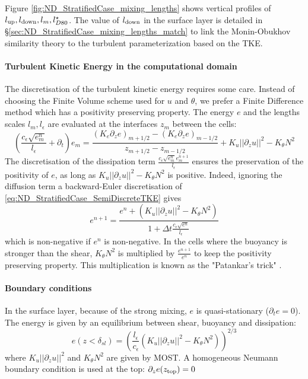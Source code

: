 Figure \ref{fig:ND_StratifiedCase_mixing_lengths} shows vertical
profiles of $l_{\rm up}, l_{\rm down}, l_m, l_{D80}^\star$. The value of
$l_{\rm down}$ in the surface layer is detailed in
\S \ref{sec:ND_StratifiedCase_mixing_lengths_match} to link
the Monin-Obukhov similarity theory to the turbulent
parameterization based on the TKE.
%
\paragraph{Turbulent Kinetic Energy in the computational domain}
The discretisation of the turbulent kinetic energy
requires some care. Instead of choosing the Finite Volume scheme
used for $u$ and $\theta$, we prefer a Finite Difference
method which has a positivity preserving property.
The energy $e$ and the lengths scales
$l_m, l_\epsilon$ are evaluated at the interfaces
$z_m$ between the cells:
\begin{equation}
\label{eq:ND_StratifiedCase_SemiDiscreteTKE}
    \left(
    \frac{c_\epsilon \sqrt{e^n_m}}{l_\epsilon}
    + \partial_t
    \right) e_m
	=\frac{(K_{e} \partial_z e)_{m+1/2} -
	(K_{e} \partial_z e)_{m-1/2}}{
	z_{m+1/2} - z_{m-1/2}
	}
    + K_u ||\partial_z u||^2
    - K_\theta N^2
\end{equation}
The discretisation of the dissipation term
$\frac{c_\epsilon \sqrt{e_m^n}e_m^{n+1}}{l_\epsilon}$
ensures the preservation
of the positivity of $e$, as long as
$K_u ||\partial_z u||^2 - K_\theta N^2$ is positive.
Indeed, ignoring the diffusion term a backward-Euler
discretisation of \eqref{eq:ND_StratifiedCase_SemiDiscreteTKE}
gives
\begin{equation}
	e^{n+1} = \frac{e^n +
	\left(K_u ||\partial_z u||^2 - K_\theta N^2\right)}
	{1 + \Delta t \frac{c_\epsilon \sqrt{e^n}}{l_\epsilon}}
\end{equation}
which is non-negative if $e^n$ is non-negative.
In the cells where the buoyancy is stronger than the shear,
$K_\theta N^2$ is multiplied by
$\frac{e^{n+1}}{e^n}$ to keep the positivity preserving property.
This multiplication is known as the "Patankar's trick"
\citep{lemarie_simplified_2021}.
%
\paragraph{Boundary conditions}
In the surface layer, because of the strong mixing, $e$ is
quasi-stationary ($\partial_t e = 0$). The energy is given by
an equilibrium between shear, buoyancy and dissipation:
\begin{equation}
	\label{eq:ND_StratifiedCase_TKE_SL_cond}
e(z<\delta_{sl}) = \left(\frac{l_\epsilon}{c_\epsilon}
(K_u||\partial_z u||^2 - K_\theta N^2)\right)^{2/3}
\end{equation}
where $K_u||\partial_z u||^2$ and $K_\theta N^2$ are given by MOST.
A homogeneous Neumann boundary condition is used at the top:
$\partial_z e (z_{\rm top}) = 0$

